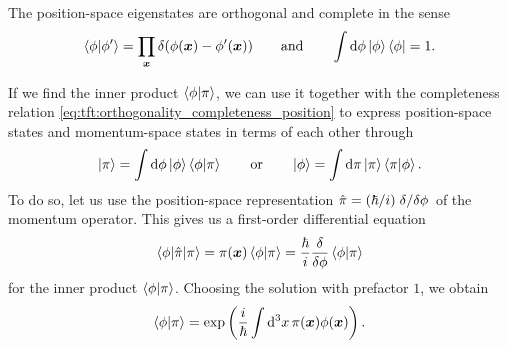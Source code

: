 The position-space eigenstates are orthogonal and complete in the sense
\begin{equation}
	\braket{\phi | \phi'} = \prod_{{\bm{x}}} \delta(\phi({\bm{x}}) - \phi'({\bm{x}}))
	\qquad \text{and} \qquad
	\int \mathop{}\!\mathrm{d} \phi \ket{\phi} \bra{\phi} = 1 .
	\label{eq:tft:orthogonality_completeness_position}
\end{equation}

\newcommand{\posmom}[2]{\exp \left(  \frac{i}{\hbar} \int \dif^3 x \, #2(\vec{x}) #1(\vec{x}) \right)}
\newcommand{\mompos}[2]{\exp \left( -\frac{i}{\hbar} \int \dif^3 x \, #1(\vec{x}) #2(\vec{x}) \right)}
If we find the inner product $\braket{\phi | \pi}$, we can use it together with the completeness relation \eqref{eq:tft:orthogonality_completeness_position} to express position-space states and momentum-space states in terms of each other through
\begin{equation}
	\ket\pi = \int \dif \phi \ket\phi \braket{\phi | \pi} %
	\qquad \text{or} \qquad
	\ket\phi = \int \dif \pi \ket\pi \braket{\pi | \phi} . %
\end{equation}
To do so, let us use the position-space representation $\hat{\pi} = (\hbar / i) \fdv{}/{\phi}$ of the momentum operator.
This gives us a first-order differential equation
\begin{equation}
	\braket{\phi | \hat{\pi} | \pi} = \pi(\vec{x}) \braket{\phi | \pi} = \frac{\hbar}{i} \fdv*{\braket{\phi | \pi}}{\phi}
\end{equation}
for the inner product $\braket{\phi | \pi}$.
Choosing the solution with prefactor $1$, we obtain
\begin{equation}
	\braket{\phi | \pi} = \posmom{\phi}{\pi} .
	\label{eq:tft:inner_product_position_momentum}
\end{equation}

